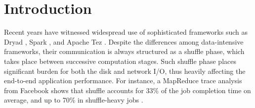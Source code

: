 \section{Introduction}
\ifrevision
\reversemarginpar
{}
\fi
Recent years have witnessed widespread use of sophisticated frameworks such as Dryad \cite{dryad}, Spark \cite{spark}, and Apache Tez \cite{tez}.
Despite the differences among data-intensive frameworks, their communication is always structured as a shuffle phase,  which takes place between successive computation stages. 
Such shuffle phase places significant burden for both the disk and network I/O, thus heavily affecting the end-to-end application performance. 
For instance, a MapReduce trace analysis from Facebook shows that shuffle accounts for 33\% of the job completion time on average, and up to 70\% in shuffle-heavy jobs \cite{managing}.

